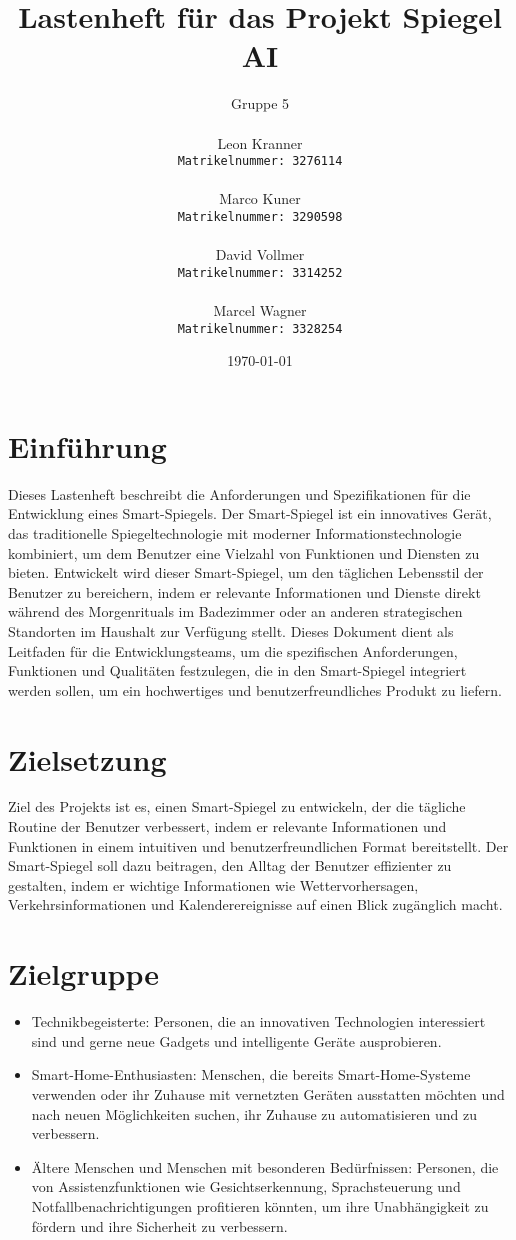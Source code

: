 \documentclass{article}
\title{Lastenheft für das Projekt Spiegel AI}
\author{
  Gruppe 5 \\ \\
  Leon Kranner \\
  \texttt{Matrikelnummer: 3276114} \\ \\
  Marco Kuner \\
  \texttt{Matrikelnummer: 3290598} \\ \\
  David Vollmer \\
  \texttt{Matrikelnummer: 3314252} \\ \\
  Marcel Wagner \\
  \texttt{Matrikelnummer: 3328254}
}
\date{\today}
\begin{document}
\maketitle


\section{Einführung}
Dieses Lastenheft beschreibt die Anforderungen und Spezifikationen für die Entwicklung eines Smart-Spiegels. Der Smart-Spiegel ist ein innovatives Gerät, das traditionelle Spiegeltechnologie mit moderner Informationstechnologie kombiniert, um dem Benutzer eine Vielzahl von Funktionen und Diensten zu bieten. Entwickelt wird dieser Smart-Spiegel, um den täglichen Lebensstil der Benutzer zu bereichern, indem er relevante Informationen und Dienste direkt während des Morgenrituals im Badezimmer oder an anderen strategischen Standorten im Haushalt zur Verfügung stellt. Dieses Dokument dient als Leitfaden für die Entwicklungsteams, um die spezifischen Anforderungen, Funktionen und Qualitäten festzulegen, die in den Smart-Spiegel integriert werden sollen, um ein hochwertiges und benutzerfreundliches Produkt zu liefern.

\section{Zielsetzung}

Ziel des Projekts ist es, einen Smart-Spiegel zu entwickeln, der die tägliche Routine der Benutzer verbessert, indem er relevante Informationen und Funktionen in einem intuitiven und benutzerfreundlichen Format bereitstellt. Der Smart-Spiegel soll dazu beitragen, den Alltag der Benutzer effizienter zu gestalten, indem er wichtige Informationen wie Wettervorhersagen, Verkehrsinformationen und Kalenderereignisse auf einen Blick zugänglich macht.  

\section{Zielgruppe}
\begin{itemize}
    \item Technikbegeisterte: Personen, die an innovativen Technologien interessiert sind und gerne neue Gadgets und intelligente Geräte ausprobieren.
    \item Smart-Home-Enthusiasten: Menschen, die bereits Smart-Home-Systeme verwenden oder ihr Zuhause mit vernetzten Geräten ausstatten möchten und nach neuen Möglichkeiten suchen, ihr Zuhause zu automatisieren und zu verbessern.
    \item Ältere Menschen und Menschen mit besonderen Bedürfnissen: Personen, die von Assistenzfunktionen wie Gesichtserkennung, Sprachsteuerung und Notfallbenachrichtigungen profitieren könnten, um ihre Unabhängigkeit zu fördern und ihre Sicherheit zu verbessern.
\end{itemize}
\end{document}
